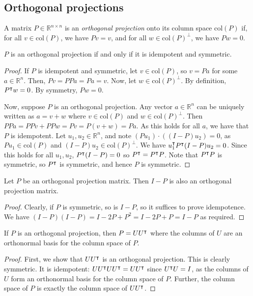 \subsection{Orthogonal projections}
\begin{definition}
	A matrix $P \in \mathbb R^{n \times n}$ is an \textit{orthogonal projection} onto its column space $\mathrm{col}(P)$ if, for all $v \in \mathrm{col}(P)$, we have $Pv = v$, and for all $w \in \mathrm{col}(P)^\perp$, we have $Pw = 0$.
\end{definition}
\begin{proposition}
	$P$ is an orthogonal projection if and only if it is idempotent and symmetric.
\end{proposition}
\begin{proof}
	If $P$ is idempotent and symmetric, let $v \in \mathrm{col}(P)$, so $v = Pa$ for some $a \in \mathbb R^n$.
	Then, $Pv = PPa = Pa = v$.
	Now, let $w \in \mathrm{col}(P)^\perp$.
	By definition, $P^\intercal w = 0$.
	By symmetry, $Pw = 0$.

	Now, suppose $P$ is an orthogonal projection.
	Any vector $a \in \mathbb R^n$ can be uniquely written as $a = v + w$ where $v \in \mathrm{col}(P)$ and $w \in \mathrm{col}(P)^\perp$.
	Then $PPa = PPv + PPw = Pv = P(v+w) = Pa$.
	As this holds for all $a$, we have that $P$ is idempotent.
	Let $u_1, u_2 \in \mathbb R^n$, and note $(P u_1) \cdot ((I-P) u_2) = 0$, as $P u_1 \in \mathrm{col}(P)$ and $(I-P) u_2 \in \mathrm{col}(P)^\perp$.
	We have $u_1^\intercal P^\intercal (I-P) u_2 = 0$.
	Since this holds for all $u_1, u_2$, $P^\intercal (I-P) = 0$ so $P^\intercal = P^\intercal P$.
	Note that $P^\intercal P$ is symmetric, so $P^\intercal$ is symmetric, and hence $P$ is symmetric.
\end{proof}
\begin{corollary}
	Let $P$ be an orthogonal projection matrix.
	Then $I-P$ is also an orthogonal projection matrix.
\end{corollary}
\begin{proof}
	Clearly, if $P$ is symmetric, so is $I-P$, so it suffices to prove idempotence.
	We have $(I-P)(I-P) = I - 2P + P^2 = I - 2P + P = I - P$ as required.
\end{proof}
\begin{proposition}
	If $P$ is an orthogonal projection, then $P = UU^\intercal$ where the columns of $U$ are an orthonormal basis for the column space of $P$.
\end{proposition}
\begin{proof}
	First, we show that $UU^\intercal$ is an orthogonal projection.
	This is clearly symmetric.
	It is idempotent: $U U^\intercal U U^\intercal = U U^\intercal$ since $U^\intercal U = I$, as the columns of $U$ form an orthonormal basis for the column space of $P$.
	Further, the column space of $P$ is exactly the column space of $U U^\intercal$.
\end{proof}
